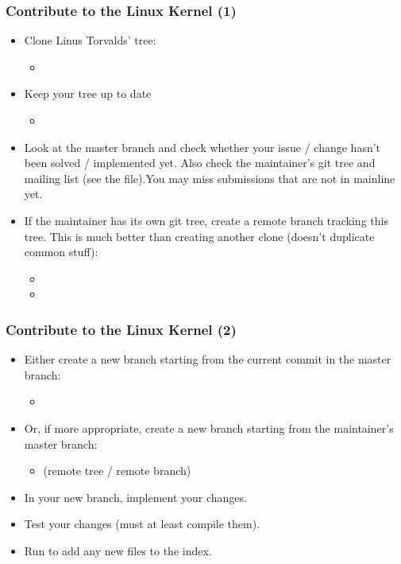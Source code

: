 \begin{frame}
  \frametitle{Contribute to the Linux Kernel (1)}
  \begin{itemize}
  \item Clone Linus Torvalds' tree:
    \begin{itemize}
    \item
    \end{itemize}
  \item Keep your tree up to date
    \begin{itemize}
    \item {}
    \end{itemize}
  \item Look at the master branch and check whether your issue /
    change hasn't been solved / implemented yet. Also check the
    maintainer's git tree and mailing list (see the 
    file).You may miss submissions that are not in mainline yet.
  \item If the maintainer has its own git tree, create a remote branch
    tracking this tree. This is much better than creating another
    clone (doesn't duplicate common stuff):
    \begin{itemize}
    \item
    \item {}
    \end{itemize}
  \end{itemize}
\end{frame}

\begin{frame}
  \frametitle{Contribute to the Linux Kernel (2)}
  \begin{itemize}
  \item Either create a new branch starting from the current commit in
    the master branch:
    \begin{itemize}
    \item {}
    \end{itemize}
  \item Or, if more appropriate, create a new branch starting from the
    maintainer's master branch:
    \begin{itemize}
    \item {} (remote
      tree / remote branch)
    \end{itemize}
  \item In your new branch, implement your changes.
  \item Test your changes (must at least compile them).
  \item Run  to add any new files to the index.
  \end{itemize}
\end{frame}

